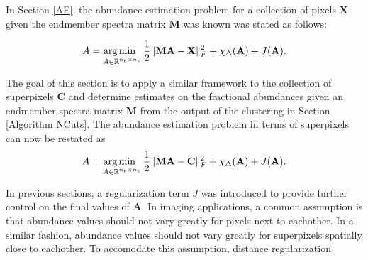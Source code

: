 In Section \ref{AE}, the abundance estimation problem for a collection of pixels $\mathbf{X}$ given the endmember spectra matrix $\mathbf{M}$ was known was stated as follows:

\begin{equation*}
    A = \operatorname*{arg\,min \;\;}_{A \in \mathbb{R}^{n_e \times n_p}} \frac{1}{2}\|\mathbf{MA} - \mathbf{X}\|_F^2 + \chi_\Delta(\mathbf{A}) + J(\mathbf{A}).
\end{equation*}

The goal of this section is to apply a similar framework to the collection of superpixels $\mathbf{C}$ and determine estimates on the fractional abundances given an endmember spectra matrix $\mathbf{M}$ from the output of the clustering in Section \ref{Algorithm NCuts}. The abundance estimation problem in terms of superpixels can now be restated as
\begin{equation*}
    A = \operatorname*{arg\,min \;\;}_{A \in \mathbb{R}^{n_e \times n_p}} \frac{1}{2}\|\mathbf{MA} - \mathbf{C}\|_F^2 + \chi_\Delta(\mathbf{A}) + J(\mathbf{A}).
\end{equation*}

In previous sections, a regularization term $J$ was introduced to provide further control on the final values of $\mathbf{A}$. In imaging applications, a common assumption is that abundance values should not vary greatly for pixels next to eachother. In a similar fashion, abundance values should not vary greatly for superpixels spatially close to eachother. To accomodate this assumption, distance regularization